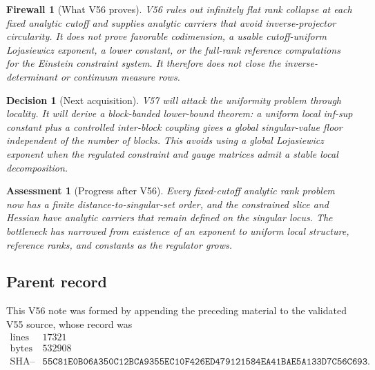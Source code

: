 \documentclass[11pt]{article}
\newtheorem{assessment}[theorem]{Assessment}
\newtheorem{firewall}[theorem]{Firewall}
\newtheorem{decision}[theorem]{Decision}
\begin{document}
\begin{firewall}[What V56 proves]
\label{fire:v11v56-boundary}
V56 rules out infinitely flat rank collapse at each fixed analytic
cutoff and supplies analytic carriers that avoid inverse-projector
circularity.  It does not prove favorable codimension, a usable
cutoff-uniform Lojasiewicz exponent, a lower constant, or the
full-rank reference computations for the Einstein constraint system.
It therefore does not close the inverse-determinant or continuum
measure rows.
\end{firewall}

\begin{decision}[Next acquisition]
\label{dec:v11v56-next}
V57 will attack the uniformity problem through locality.  It will
derive a block-banded lower-bound theorem: a uniform local inf-sup
constant plus a controlled inter-block coupling gives a global
singular-value floor independent of the number of blocks.  This avoids
using a global Lojasiewicz exponent when the regulated constraint and
gauge matrices admit a stable local decomposition.
\end{decision}

\begin{assessment}[Progress after V56]
\label{ass:v11v56-status}
Every fixed-cutoff analytic rank problem now has a finite
distance-to-singular-set order, and the constrained slice and Hessian
have analytic carriers that remain defined on the singular locus.
The bottleneck has narrowed from existence of an exponent to uniform
local structure, reference ranks, and constants as the regulator
grows.
\end{assessment}

\subsection{Parent record}

This V56 note was formed by appending the preceding material to the
validated V55 source, whose record was
\[
\begin{array}{c|c}
\text{lines}&17321\\
\text{bytes}&532908\\
\text{SHA--256}&
\texttt{55C81E0B06A350C12BCA9355EC10F426ED479121584EA41BAE5A133D7C56C693}.
\end{array}                                                     \tag{56.18}
\]

\end{document}
